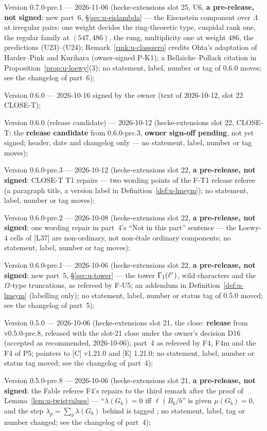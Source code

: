 \documentclass[11pt]{article}
\newcommand{\Iw}{\Lambda}                         %
\newcommand{\Om}[1]{\Omega_{#1}}                      %
\begin{document}
Version 0.7.0-pre.1 --- 2026-11-06 (hecke-extensions slot 25, U6, \textbf{a pre-release, not signed}: new part~6, \S\ref{sec:u-eislambda} --- the Eisenstein component over $\Iw$ at irregular pairs: one weight decides the ring-theoretic type, cuspidal rank one, the regular family at $(547,486)$, the rung, multiplicity one at weight $486$, the predictions (U23)--(U24); Remark~\ref{rmk:u-classzero} credits Ohta's adaptation of Harder--Pink and Kurihara (owner-signed P-K1); a Bella\"\i che--Pollack citation in Proposition~\ref{prop:u-loewy}(3); no statement, label, number or tag of 0.6.0 moves; see the changelog of part~6);

Version 0.6.0 --- 2026-10-16 signed by the owner (text of 2026-10-12, slot 22 CLOSE-T);

Version 0.6.0 (release candidate) --- 2026-10-12 (hecke-extensions slot 22, CLOSE-T: the \textbf{release candidate} from 0.6.0-pre.3, \textbf{owner sign-off pending}, not yet signed; header, date and changelog only --- no statement, label, number or tag moves);

Version 0.6.0-pre.3 --- 2026-10-12 (hecke-extensions slot 22, \textbf{a pre-release, not signed}: CLOSE-T T1 repairs --- two wording points of the F-T1 release referee (a paragraph title, a version label in Definition~\ref{def:u-lmsym}); no statement, label, number or tag moves);

Version 0.6.0-pre.2 --- 2026-10-08 (hecke-extensions slot 22, \textbf{a pre-release, not signed}: one wording repair in part~4's ``Not in this part'' sentence --- the Loewy-$4$ cells of [L37] are non-ordinary, not non-étale ordinary components; no statement, label, number or tag moves);

Version 0.6.0-pre.1 --- 2026-10-06 (hecke-extensions slot 22, \textbf{a pre-release, not signed}: new part~5, \S\ref{sec:u-tower} --- the tower $\Gamma_1(\ell^{r})$, wild characters
and the $\Om{}$-type truncations, as refereed by F-U5; an addendum in Definition~\ref{def:u-lmsym} (labelling only); no statement, label, number or status tag of 0.5.0 moved;
see the changelog of part~5);

Version 0.5.0 --- 2026-10-06 (hecke-extensions slot 21, the close: \textbf{release} from v0.5.0-pre.8, released with the slot-21 close under the owner's decision D16
(accepted as recommended, 2026-10-06); part~4 as refereed by F4, F4m and the F4 of P5; pointers to [C] v1.21.0 and [E] 1.21.0; no statement, label, number or status tag moved; see the changelog of part~4);

Version 0.5.0-pre.8 --- 2026-10-06 (hecke-extensions slot 21, \textbf{a pre-release, not signed}: the Fable referee F4's repairs to the third remark after the proof of
Lemma~\ref{lem:u-twistvalues} --- ``$\lambda(G_b)=0$ iff $\ell\nmid B_b/b$'' is \PROVED{} given $\mu(G_b)=0$, and the step $\lambda_p=\sum_b\lambda(G_b)$ behind \cite{hho} is tagged \STD; no statement, label, tag or number changed; see the changelog of part~4);
\end{document}
